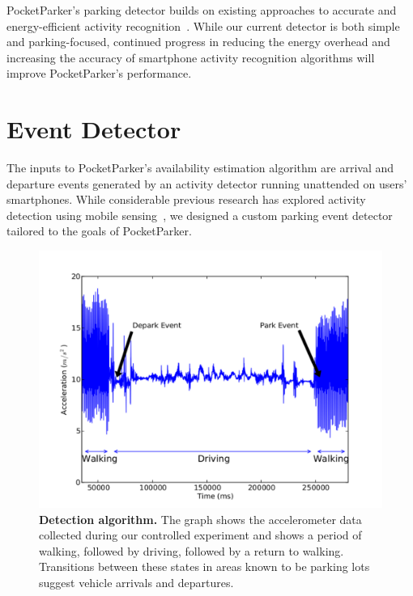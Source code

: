 \documentclass{sigchi}
\begin{document}
PocketParker's parking detector builds on existing approaches to accurate
and energy-efficient activity recognition~\cite{Constandache:2010:DYS,
Keally:2011:PTP, Reddy:2010:UMP, Yang:2011:DDP, Wang:2009:FEE}. While our
current detector is both simple and parking-focused, continued progress in
reducing the energy overhead and increasing the accuracy of smartphone
activity recognition algorithms will improve PocketParker's performance.


\section{Event Detector}

The inputs to PocketParker's availability estimation algorithm are arrival
and departure events generated by an activity detector running unattended on
users' smartphones.  While considerable previous research has explored
activity detection using mobile sensing~\cite{Constandache:2010:DYS,
Keally:2011:PTP, Reddy:2010:UMP, Yang:2011:DDP, Wang:2009:FEE}, we designed a
custom parking event detector tailored to the goals of PocketParker. 

\begin{figure}[t]
  \centering
  \includegraphics[width=0.8\columnwidth]{./figures/detection-cropped.pdf}

  \caption{\textbf{Detection algorithm.} The graph shows the accelerometer
    data collected during our controlled experiment and shows a period of
    walking, followed by driving, followed by a return to walking.
    Transitions between these states in areas known to be parking lots
  suggest vehicle arrivals and departures.}

  \label{fig-detection}
\end{figure}
\end{document}
